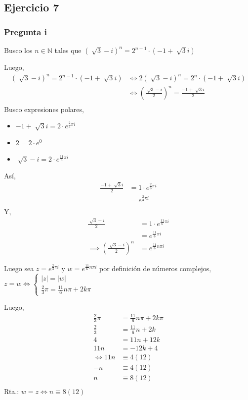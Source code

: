 \subsection{Ejercicio 7}

\subsubsection{Pregunta i}

Busco los $ n \in \mathbb{N} $ tales que $ (\sqrt[]{3}-i)^n = 2^{n-1}\cdot (-1+\sqrt[]{3}i) $

Luego,
\begin{align*}
    (\sqrt[]{3}-i)^n = 2^{n-1}\cdot (-1+\sqrt[]{3}i) &\iff 2(\sqrt[]{3}-i)^n = 2^{n}\cdot (-1+\sqrt[]{3}i) \\
    &\iff \left(\frac{\sqrt[]{3}-i}{2}\right)^n = \frac{-1+\sqrt[]{3}i}{2} \\
\end{align*}
Busco expresiones polares,
\begin{itemize}
    \item $ -1+\sqrt[]{3}i = 2\cdot e^{\frac{2}{3}\pi i} $
    \item $ 2 = 2\cdot e^{0} $
    \item $ \sqrt[]{3}-i = 2\cdot e^{\frac{11}{6}\pi i} $
\end{itemize}
Así,
\begin{align*}
    \frac{-1+\sqrt[]{3}i}{2} &= 1\cdot e^{\frac{2}{3}\pi i} \\
    &= e^{\frac{2}{3}\pi i} \\
\end{align*}
Y,
\begin{align*}
    \frac{\sqrt[]{3}-i}{2} &= 1\cdot e^{\frac{11}{6}\pi i} \\
    &= e^{\frac{11}{6}\pi i} \\
    \implies \left(\frac{\sqrt[]{3}-i}{2}\right)^n &= e^{\frac{11}{6}n\pi i}
\end{align*}

Luego sea $ z = e^{\frac{2}{3}\pi i} $ y $ w = e^{\frac{11}{6}n\pi i} $ por definición de números complejos,
$
    z = w \iff \begin{cases}
        |z| = |w| \\
        \frac{2}{3}\pi = \frac{11}{6}n\pi +2k\pi
    \end{cases}
$

Luego,
\begin{align*}
    \frac{2}{3}\pi &= \frac{11}{6}n\pi +2k\pi \\
    \frac{2}{3} &= \frac{11}{6}n +2k \\
    4 &= 11n + 12k \\
    11n &= - 12k + 4 \\
    \iff 11n &\equiv 4(12) \\
    -n &\equiv 4(12) \\
    n &\equiv 8(12) \\
\end{align*}
Rta.: $ w = z \iff n \equiv 8(12) $

